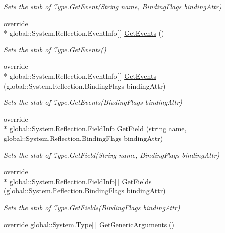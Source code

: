 \begin{DoxyCompactItemize}
\begin{DoxyCompactList}\small\item\em Sets the stub of Type.\-Get\-Event(\-String name, Binding\-Flags binding\-Attr)\end{DoxyCompactList}\item 
override \\*
global\-::\-System.\-Reflection.\-Event\-Info\mbox{[}$\,$\mbox{]} \hyperlink{class_system_1_1_fakes_1_1_stub_type_aaf0e6a63fd7290f5efab3350d75e2777}{Get\-Events} ()
\begin{DoxyCompactList}\small\item\em Sets the stub of Type.\-Get\-Events()\end{DoxyCompactList}\item 
override \\*
global\-::\-System.\-Reflection.\-Event\-Info\mbox{[}$\,$\mbox{]} \hyperlink{class_system_1_1_fakes_1_1_stub_type_a7c18b01e194c3771ca0058ec179e2199}{Get\-Events} (global\-::\-System.\-Reflection.\-Binding\-Flags binding\-Attr)
\begin{DoxyCompactList}\small\item\em Sets the stub of Type.\-Get\-Events(\-Binding\-Flags binding\-Attr)\end{DoxyCompactList}\item 
override \\*
global\-::\-System.\-Reflection.\-Field\-Info \hyperlink{class_system_1_1_fakes_1_1_stub_type_a4cce95957e485dfb89cc779e62686504}{Get\-Field} (string name, global\-::\-System.\-Reflection.\-Binding\-Flags binding\-Attr)
\begin{DoxyCompactList}\small\item\em Sets the stub of Type.\-Get\-Field(\-String name, Binding\-Flags binding\-Attr)\end{DoxyCompactList}\item 
override \\*
global\-::\-System.\-Reflection.\-Field\-Info\mbox{[}$\,$\mbox{]} \hyperlink{class_system_1_1_fakes_1_1_stub_type_ac514ed48c95303eb8d2e0d7c37f7a360}{Get\-Fields} (global\-::\-System.\-Reflection.\-Binding\-Flags binding\-Attr)
\begin{DoxyCompactList}\small\item\em Sets the stub of Type.\-Get\-Fields(\-Binding\-Flags binding\-Attr)\end{DoxyCompactList}\item 
override global\-::\-System.\-Type\mbox{[}$\,$\mbox{]} \hyperlink{class_system_1_1_fakes_1_1_stub_type_accaf9fc399baa82f55fe0e7e5999bb89}{Get\-Generic\-Arguments} ()

\end{DoxyCompactItemize}
